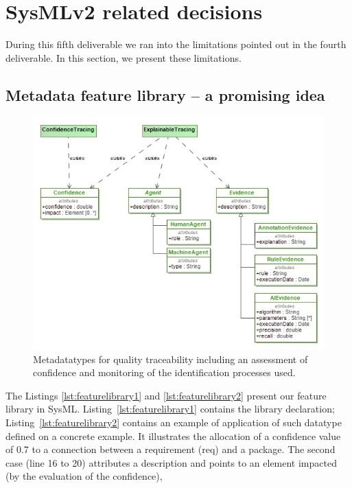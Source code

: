 
\section{SysMLv2 related decisions}

During this fifth deliverable we ran into the limitations pointed out in the fourth deliverable. In this section, we present these limitations. 


\subsection{Metadata feature library -- a promising idea}
\begin{figure}[ht] 
	\centering
	\includegraphics[width=.9\linewidth]{images/explainability-datatype.jpg}
	\caption{Metadatatypes for quality traceability including an assessment of confidence and monitoring of the identification processes used.}
	\label{fig:datatypes}
\end{figure}

The Listings \ref{lst:featurelibrary1} and \ref{lst:featurelibrary2} present our feature library {in SysML}. Listing~\ref{lst:featurelibrary1} contains the library declaration; Listing~\ref{lst:featurelibrary2} contains an example of application of such datatype  defined on a concrete example. It illustrates the allocation of a confidence value of 0.7 to a connection between a requirement (req) and a package. The second case (line 16 to 20) attributes a description and points to an element impacted (by the evaluation of the confidence),




